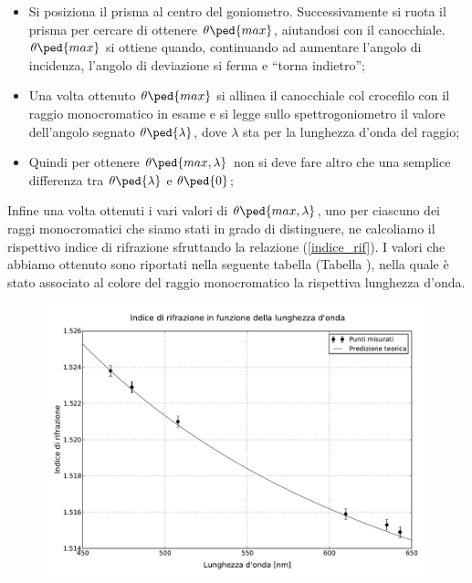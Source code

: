\begin{itemize}
	\item{Si posiziona il prisma al centro del goniometro. Successivamente si ruota il prisma per cercare di ottenere $\theta\ped{max}$, aiutandosi con il canocchiale. $\theta\ped{max}$ si ottiene quando, continuando ad aumentare l'angolo di incidenza, l'angolo di deviazione si ferma e ``torna indietro'';}
	\item{Una volta ottenuto $\theta\ped{max}$ si allinea il canocchiale col crocefilo con il raggio monocromatico in esame e si legge sullo spettrogoniometro il valore dell'angolo segnato $\theta\ped{\lambda}$, dove $\lambda$ sta per la lunghezza d'onda del raggio;}
	\item{Quindi per ottenere $\theta\ped{max,\lambda}$ non si deve fare altro che una semplice differenza tra $\theta\ped{\lambda}$ e $\theta\ped{0}$;}
\end{itemize}

Infine una volta ottenuti i vari valori di $\theta\ped{max,\lambda}$, uno per ciascuno dei raggi monocromatici che siamo stati in grado di distinguere, ne calcoliamo il rispettivo indice di rifrazione sfruttando la relazione (\ref{indice_rif}). I valori che abbiamo ottenuto sono riportati nella seguente tabella (Tabella \label{tab:enne}), nella quale è stato associato al colore del raggio monocromatico la rispettiva lunghezza d'onda.



\begin{figure}[t]
    \includegraphics[width=16cm]{wave_index.pdf}
    \caption{}
    \label{fig:prisma}
\end{figure}

